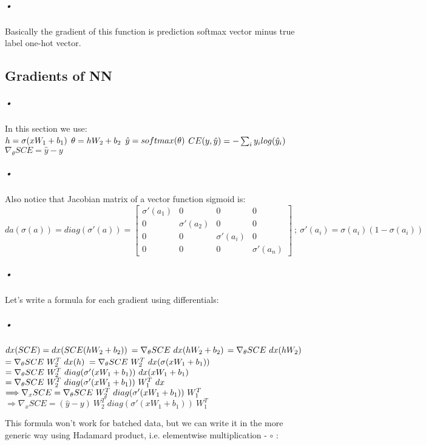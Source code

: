 \documentclass{article}
\begin{document}
\subparagraph{•}
Basically the gradient of this function is prediction softmax vector minus true label one-hot vector.

\subsection{Gradients of NN}
\subparagraph{•}
In this section we use:\\
$h=\sigma(x W_1 + b_1) \\$
$\theta = h W_2 + b_2 \\$
$\hat{y}= softmax(\theta) \\$
$CE(y,\hat{y}) = -\sum_{i} y_i log(\hat{y}_i)\\$
$\nabla_\theta SCE = \hat{y}-y$

\subparagraph{•}
Also notice that Jacobian matrix of a vector function sigmoid is:\\
$da(\sigma (a))=diag(\sigma' (a))= \begin{bmatrix}
\sigma' (a_1) & 0 & 0 & 0\\
0 & \sigma' (a_2) & 0 & 0\\
0 & 0 & \sigma' (a_i) & 0\\
0 & 0 & 0 & \sigma' (a_n) 
\end{bmatrix} \ ; \ \sigma' (a_i)=\sigma(a_i)(1-\sigma(a_i))$

\subparagraph{•}
Let's write a formula for each gradient using differentials:

\subparagraph{•}
$dx(SCE)=dx(SCE(hW_2+b_2)) \\$
$= \nabla_\theta SCE \ dx(hW_2+b_2) \\$
$= \nabla_\theta SCE \ dx(hW_2) \\$
$= \nabla_\theta SCE \ W_2^T \ dx(h) \\$
$= \nabla_\theta SCE \ W_2^T \ dx(\sigma (xW_1+b_1)) \\$
$= \nabla_\theta SCE \ W_2^T \ diag(\sigma' (xW_1+b_1)) \ dx(xW_1+b_1) \\$
$= \nabla_\theta SCE \ W_2^T \ diag(\sigma' (xW_1+b_1)) \ W_1^T \ dx \\$
$\Longrightarrow \nabla_x SCE = \nabla_\theta SCE \ W_2^T \ diag(\sigma' (xW_1+b_1)) \ W_1^T \\$
$\Longrightarrow \nabla_x SCE = (\hat{y}-y) \ W_2^T \ diag(\sigma' (xW_1+b_1)) \ W_1^T$

This formula won't work for batched data, but we can write it in the more generic way using Hadamard product, i.e. elementwise multiplication - $\circ$ :
\end{document}
